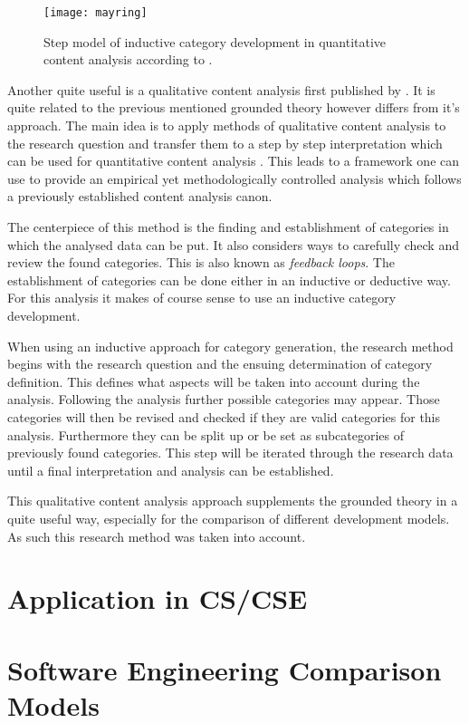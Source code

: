 \begin{figure}[htbp]
  \centering
  \texttt{[image: mayring]}
  \caption{Step model of inductive category development in quantitative content
    analysis according to \citeauthor{Mayring2008} \cite{Mayring2000,Mayring2008}.}
\end{figure}

Another quite useful is a qualitative content analysis first published by
\textcite{Mayring2008}. It is quite related to the previous mentioned grounded
theory however differs from it's approach. The main idea is to apply methods of
qualitative content analysis to the research question and transfer them to a
step by step interpretation which can be used for quantitative content analysis
\cite{Mayring2000}. This leads to a framework one can use to provide an
empirical yet methodologically controlled analysis which follows a previously
established content analysis canon.

The centerpiece of this method is the finding and establishment of categories
in which the analysed data can be put. It also considers ways to carefully
check and review the found categories. This is also known as \emph{feedback
loops}. The establishment of categories can be done either in an inductive or
deductive way. For this analysis it makes of course sense to use an inductive
category development.

When using an inductive approach for category generation, the research method
begins with the research question and the ensuing determination of category
definition. This defines what aspects will be taken into account during the
analysis. Following the analysis further possible categories may appear. Those
categories will then be revised and checked if they are valid categories for
this analysis. Furthermore they can be split up or be set as subcategories of
previously found categories. This step will be iterated through the research
data until a final interpretation and analysis can be established.

This qualitative content analysis approach supplements the grounded theory in a
quite useful way, especially for the comparison of different development
models. As such this research method was taken into account.


\section{Application in CS/CSE} %


\section{Software Engineering Comparison Models} %



